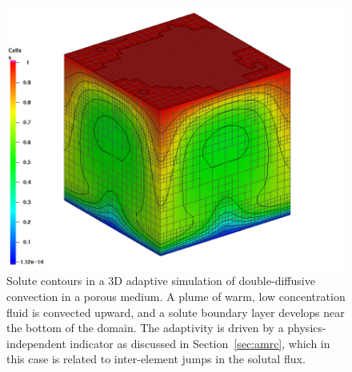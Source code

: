 \documentclass[global,twocolumn,final]{svjour}
\begin{document}
\begin{figure}[hbt]
  \begin{center}
    \includegraphics[width=\columnwidth]{figures/dd}    
    \caption{Solute contours in a 3D adaptive simulation of
      double-diffusive convection in a porous medium.  A plume of
      warm, low concentration fluid is convected upward, and a solute
      boundary layer develops near the bottom of the domain.  The adaptivity
      is driven by a physics-independent indicator as discussed in
      Section~\ref{sec:amrc}, which in this case is related to inter-element
      jumps in the solutal flux.
      \label{fig:dd}}
  \end{center}
\end{figure}
\end{document}
